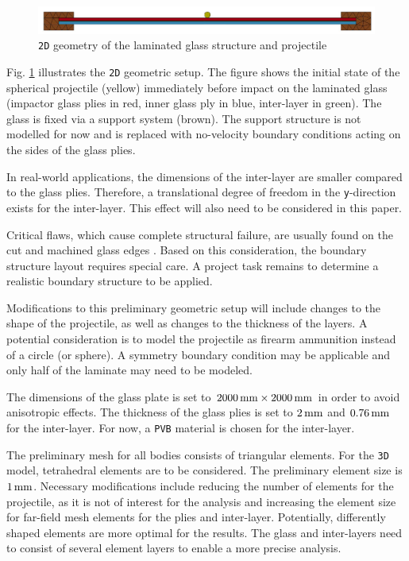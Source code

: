 \begin{figure}[h!]
    \centering
    \includegraphics[width=\columnwidth]{Geometry}
    \caption{\texttt{2D} geometry of the laminated glass structure and projectile \cite{Che18}}
    \label{fig:geometry}
\end{figure}

Fig. \ref{fig:geometry} illustrates the \texttt{2D} geometric setup. The figure shows the initial state of the spherical projectile (yellow) immediately before impact on the laminated glass (impactor glass plies in red, inner glass ply in blue, inter-layer in green). The glass is fixed via a support system (brown). The support structure is not modelled for now and is replaced with no-velocity boundary conditions acting on the sides of the glass plies. 

\bigbreak
In real-world applications, the dimensions of the inter-layer are smaller compared to the glass plies. Therefore, a translational degree of freedom in the \texttt{y}-direction exists for the inter-layer. This effect will also need to be considered in this paper.

\bigbreak
Critical flaws, which cause complete structural failure, are usually found on the cut and machined glass edges \cite{Pel16}. Based on this consideration, the boundary structure layout requires special care. A project task remains to determine a realistic boundary structure to be applied.

\bigbreak
Modifications to this preliminary geometric setup will include changes to the shape of the projectile, as well as changes to the thickness of the layers. A potential consideration is to model the projectile as firearm ammunition instead of a circle (or sphere). A symmetry boundary condition may be applicable and only half of the laminate may need to be modeled.

\bigbreak
The dimensions of the glass plate is set to $2000\,{\rm{mm}}\times2000\,{\rm{mm}}$ in order to avoid anisotropic effects. The thickness of the glass plies is set to $2\,{\rm{mm}}$ and $0.76\,{\rm{mm}}$ for the inter-layer. For now, a \texttt{PVB} material is chosen for the inter-layer.

\bigbreak
The preliminary mesh for all bodies consists of triangular elements. For the \texttt{3D} model, tetrahedral elements \cite{Che18} are to be considered. The preliminary element size is $1\,{\rm{mm}}$. Necessary modifications include reducing the number of elements for the projectile, as it is not of interest for the analysis and increasing the element size for far-field mesh elements for the plies and inter-layer. Potentially, differently shaped elements are more optimal for the results. The glass and inter-layers need to consist of several element layers to enable a more precise analysis. 

